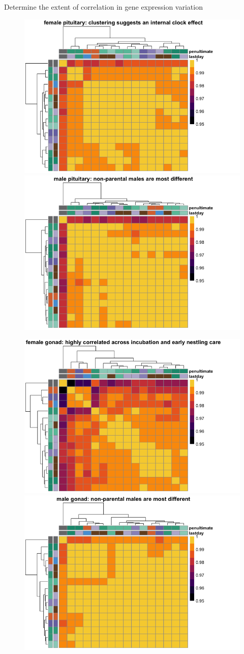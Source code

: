 \documentclass[final]{beamer}
\newlength{\onecolwid}
\newlength{\twocolwid}
\begin{document}
\begin{frame}[t]
\begin{columns}[t]
\begin{column}{\twocolwid}
\begin{columns}[t,totalwidth=\twocolwid]
\begin{column}{\onecolwid}
\begin{block}{{\normalsize Determine the extent of correlation in gene expression variation}}
\begin{figure}
\includegraphics[width=0.5\linewidth]{correlationheatmaps-2.png}
\includegraphics[width=0.5\linewidth]{correlationheatmaps-5.png}
\end{figure}


\begin{figure}
\includegraphics[width=0.5\linewidth]{correlationheatmaps-3.png}
\includegraphics[width=0.5\linewidth]{correlationheatmaps-6.png}
\end{figure}

\end{block}


\end{column}
\end{columns}
\end{column}
\end{columns}
\end{frame}
\end{document}
